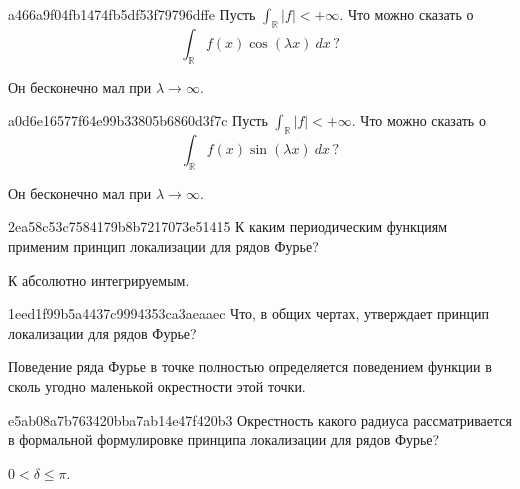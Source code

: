 \begin{note}{a466a9f04fb1474fb5df53f79796dffe}
    Пусть \({ \int_{\mathbb R} \left\lvert f \right\rvert < +\infty }\).
    Что можно сказать о
    \[
        \int_{\mathbb R} f(x) \cos (\lambda x)\: dx\,?
    \]

    \begin{cloze}{1}
        Он бесконечно мал при \({ \lambda \to \infty }\).
    \end{cloze}
\end{note}

\begin{note}{a0d6e16577f64e99b33805b6860d3f7c}
    Пусть \({ \int_{\mathbb R} \left\lvert f \right\rvert < +\infty }\).
    Что можно сказать о
    \[
        \int_{\mathbb R} f(x) \sin (\lambda x)\: dx\,?
    \]

    \begin{cloze}{1}
        Он бесконечно мал при \({ \lambda \to \infty }\).
    \end{cloze}
\end{note}

\begin{note}{2ea58c53c7584179b8b7217073e51415}
    К каким периодическим функциям применим принцип локализации для рядов Фурье?

    \begin{cloze}{1}
        К абсолютно интегрируемым.
    \end{cloze}
\end{note}

\begin{note}{1eed1f99b5a4437c9994353ca3aeaaec}
    Что, в общих чертах, утверждает принцип локализации для рядов Фурье?

    \begin{cloze}{1}
        Поведение ряда Фурье в точке полностью определяется поведением функции в сколь угодно маленькой окрестности этой точки.
    \end{cloze}
\end{note}

\begin{note}{e5ab08a7b763420bba7ab14e47f420b3}
    Окрестность какого радиуса рассматривается в формальной формулировке принципа локализации для рядов Фурье?

    \begin{cloze}{1}
        \({ 0 < \delta \leqslant \pi }\).
    \end{cloze}
\end{note}


